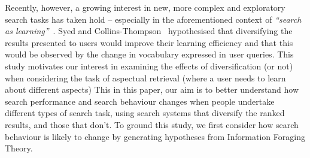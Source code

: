 Recently, however, a growing interest in new, more complex and exploratory search tasks has taken hold -- especially in the aforementioned context of \emph{``search as learning''}~\cite{collins2017sal}. Syed and Collins-Thompson~\cite{syed2017sal} hypothesised that diversifying the results presented to users would improve their learning efficiency and that this would be observed by the change in vocabulary expressed in user queries. This study motivates our interest in examining the effects of diversification (or not)  when considering the task of aspectual retrieval (where a user needs to learn about different aspects)  This in this paper, our aim is to better understand how search performance and search behaviour changes when people undertake different types of search task, using search systems that diversify the ranked results, and those that don't. To ground this study, we first consider how search behaviour is likely to change by generating hypotheses from Information Foraging Theory.





